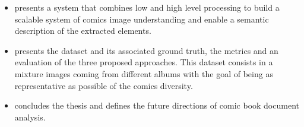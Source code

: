 \begin{itemize}


\item {} presents a system that combines low and high level processing to build a scalable system of comics image understanding and enable a semantic description of the extracted elements.


\item {} presents the dataset and its associated ground truth, the metrics and an evaluation of the three proposed approaches.
This dataset consists in a mixture images coming from different albums with the goal of being as representative as possible of the comics diversity.

\item {} concludes the thesis and defines the future directions of comic book document analysis.

\end{itemize}


